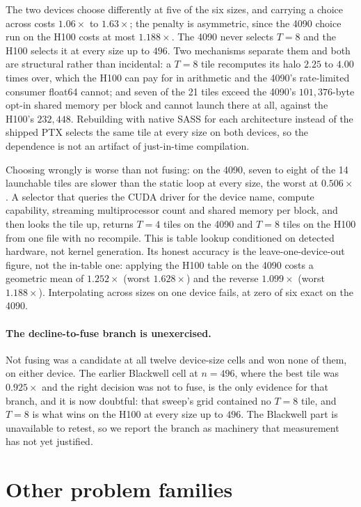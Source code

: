 \documentclass[11pt]{article}
\begin{document}
The two devices choose differently at five of the six sizes, and carrying a
choice across costs $1.06\times$ to $1.63\times$; the penalty is asymmetric,
since the 4090 choice run on the H100 costs at most $1.188\times$. The 4090
never selects $T = 8$ and the H100 selects it at every size up to $496$. Two
mechanisms separate them and both are structural rather than incidental: a
$T = 8$ tile recomputes its halo $2.25$ to $4.00$ times over, which the H100
can pay for in arithmetic and the 4090's rate-limited consumer float64 cannot;
and seven of the 21 tiles exceed the 4090's $101{,}376$-byte opt-in shared
memory per block and cannot launch there at all, against the H100's
$232{,}448$. Rebuilding with native SASS for each architecture instead of the
shipped PTX selects the same tile at every size on both devices, so the
dependence is not an artifact of just-in-time compilation.

Choosing wrongly is worse than not fusing: on the 4090, seven to eight of the
14 launchable tiles are slower than the static loop at every size, the worst at
$0.506\times$. A selector that queries the CUDA driver for the device name,
compute capability, streaming multiprocessor count and shared memory per block,
and then looks the tile up, returns $T = 4$ tiles on the 4090 and $T = 8$ tiles
on the H100 from one file with no recompile. This is table lookup conditioned
on detected hardware, not kernel generation. Its honest accuracy is the
leave-one-device-out figure, not the in-table one: applying the H100 table on
the 4090 costs a geometric mean of $1.252\times$ (worst $1.628\times$) and the
reverse $1.099\times$ (worst $1.188\times$). Interpolating across sizes on one
device fails, at zero of six exact on the 4090.

\paragraph{The decline-to-fuse branch is unexercised.}
Not fusing was a candidate at all twelve device-size cells and won none of
them, on either device. The earlier Blackwell cell at $n = 496$, where the best
tile was $0.925\times$ and the right decision was not to fuse, is the only
evidence for that branch, and it is now doubtful: that sweep's grid contained
no $T = 8$ tile, and $T = 8$ is what wins on the H100 at every size up to
$496$. The Blackwell part is unavailable to retest, so we report the branch as
machinery that measurement has not yet justified.

\section{Other problem families}
\label{app:log:families}
\end{document}

